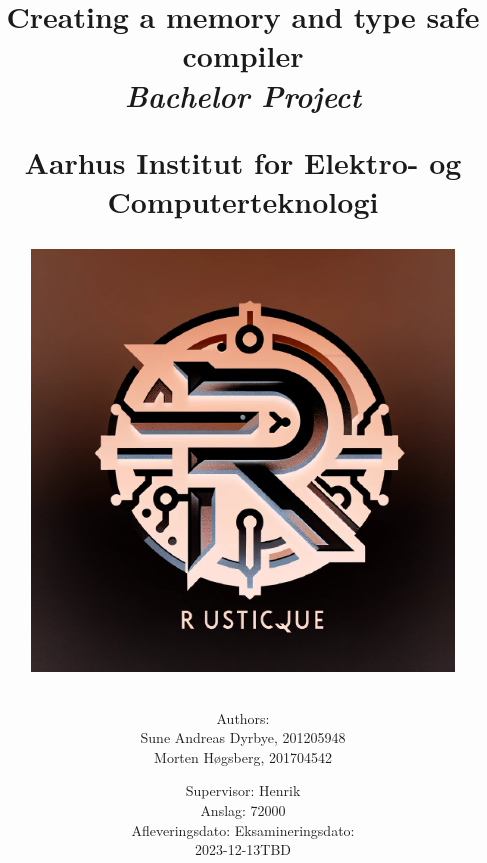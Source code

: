 \newcommand{\authorName}{}
\newcommand{\titleName}{Creating a memory and type safe compiler}
\newcommand{\subject}{Bachelor Project}
\newcommand{\vejleder}{Supervisor: Henrik}
\newcommand{\institute}{Aarhus Institut for Elektro- og Computerteknologi}
\begin{titlepage}
  \centering
    \title
    {
      \Huge \textbf{\titleName}\\
      \scale{\numberSQRTTWO}{\vspace{\sol pt}}
      \LARGE \textit{\subject}
      \scale{\numberSQRTTWO}{\rule{\linewidth}{\sol pt}}

      \textbf{\institute}

      \begin{figure}[h]
        \centering
        \includegraphics[scale=0.50]{02-Body/Images/rusticqueLogo.png}
      \end{figure}

      \author
    {
      \LARGE Authors: \\
      Sune Andreas Dyrbye, 201205948 \\
      Morten Høgsberg, 201704542 \\
      }
           \date{
        \Large \vejleder \\
        Anslag: 72000\\
        \vspace{1em}
        Afleveringsdato: \hfill
        Eksamineringsdato:\\
        2023-12-13\hfill TBD
      }


    }
   
\end{titlepage}
